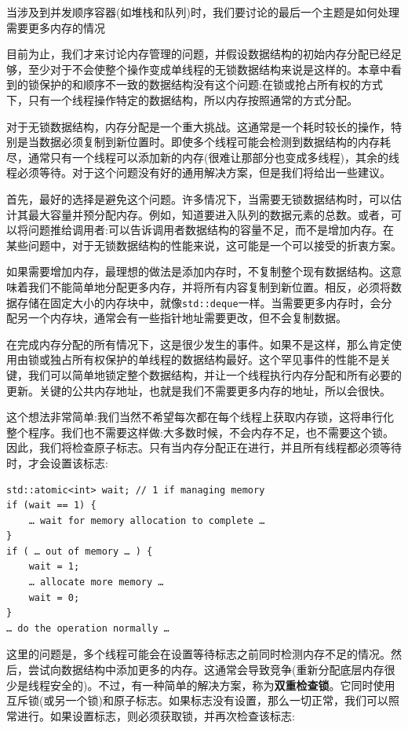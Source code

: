 当涉及到并发顺序容器(如堆栈和队列)时，我们要讨论的最后一个主题是如何处理需要更多内存的情况


目前为止，我们才来讨论内存管理的问题，并假设数据结构的初始内存分配已经足够，至少对于不会使整个操作变成单线程的无锁数据结构来说是这样的。本章中看到的锁保护的和顺序不一致的数据结构没有这个问题:在锁或抢占所有权的方式下，只有一个线程操作特定的数据结构，所以内存按照通常的方式分配。

对于无锁数据结构，内存分配是一个重大挑战。这通常是一个耗时较长的操作，特别是当数据必须复制到新位置时。即使多个线程可能会检测到数据结构的内存耗尽，通常只有一个线程可以添加新的内存(很难让那部分也变成多线程)，其余的线程必须等待。对于这个问题没有好的通用解决方案，但是我们将给出一些建议。

首先，最好的选择是避免这个问题。许多情况下，当需要无锁数据结构时，可以估计其最大容量并预分配内存。例如，知道要进入队列的数据元素的总数。或者，可以将问题推给调用者:可以告诉调用者数据结构的容量不足，而不是增加内存。在某些问题中，对于无锁数据结构的性能来说，这可能是一个可以接受的折衷方案。

如果需要增加内存，最理想的做法是添加内存时，不复制整个现有数据结构。这意味着我们不能简单地分配更多内存，并将所有内容复制到新位置。相反，必须将数据存储在固定大小的内存块中，就像\texttt{std::deque}一样。当需要更多内存时，会分配另一个内存块，通常会有一些指针地址需要更改，但不会复制数据。

在完成内存分配的所有情况下，这是很少发生的事件。如果不是这样，那么肯定使用由锁或独占所有权保护的单线程的数据结构最好。这个罕见事件的性能不是关键，我们可以简单地锁定整个数据结构，并让一个线程执行内存分配和所有必要的更新。关键的公共内存地址，也就是我们不需要更多内存的地址，所以会很快。

这个想法非常简单:我们当然不希望每次都在每个线程上获取内存锁，这将串行化整个程序。我们也不需要这样做:大多数时候，不会内存不足，也不需要这个锁。因此，我们将检查原子标志。只有当内存分配正在进行，并且所有线程都必须等待时，才会设置该标志:

\begin{lstlisting}[style=styleCXX]
std::atomic<int> wait; // 1 if managing memory
if (wait == 1) {
	… wait for memory allocation to complete …
}
if ( … out of memory … ) {
	wait = 1;
	… allocate more memory …
	wait = 0;
}
… do the operation normally … 
\end{lstlisting}

这里的问题是，多个线程可能会在设置等待标志之前同时检测内存不足的情况。然后，尝试向数据结构中添加更多的内存。这通常会导致竞争(重新分配底层内存很少是线程安全的)。不过，有一种简单的解决方案，称为\textbf{双重检查锁}。它同时使用互斥锁(或另一个锁)和原子标志。如果标志没有设置，那么一切正常，我们可以照常进行。如果设置标志，则必须获取锁，并再次检查该标志:

